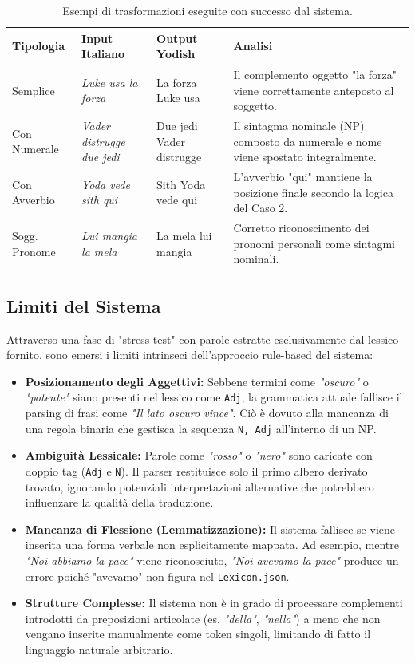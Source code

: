 \documentclass[12pt, a4paper]{article}
\begin{document}
\begin{table}[h!]
\centering
\small
\begin{tabular}{|l|l|l|p{5cm}|}
\hline
\textbf{Tipologia} & \textbf{Input Italiano} & \textbf{Output Yodish} & \textbf{Analisi} \\ \hline
Semplice & \textit{Luke usa la forza} & La forza Luke usa & Il complemento oggetto "la forza" viene correttamente anteposto al soggetto. \\ \hline
Con Numerale & \textit{Vader distrugge due jedi} & Due jedi Vader distrugge & Il sintagma nominale (NP) composto da numerale e nome viene spostato integralmente. \\ \hline
Con Avverbio & \textit{Yoda vede sith qui} & Sith Yoda vede qui & L'avverbio "qui" mantiene la posizione finale secondo la logica del Caso 2. \\ \hline
Sogg. Pronome & \textit{Lui mangia la mela} & La mela lui mangia & Corretto riconoscimento dei pronomi personali come sintagmi nominali. \\ \hline
\end{tabular}
\caption{Esempi di trasformazioni eseguite con successo dal sistema.}
\label{tab:test_successo}
\end{table}

\subsection{Limiti del Sistema}
Attraverso una fase di "stress test" con parole estratte esclusivamente dal lessico fornito, sono emersi i limiti intrinseci dell'approccio rule-based del sistema:

\begin{itemize}
    \item \textbf{Posizionamento degli Aggettivi:} Sebbene termini come \textit{"oscuro"} o \textit{"potente"} siano presenti nel lessico come \texttt{Adj}, la grammatica attuale fallisce il parsing di frasi come \textit{"Il lato oscuro vince"}. Ciò è dovuto alla mancanza di una regola binaria che gestisca la sequenza \texttt{N, Adj} all'interno di un NP.
    \item \textbf{Ambiguità Lessicale:} Parole come \textit{"rosso"} o \textit{"nero"} sono caricate con doppio tag (\texttt{Adj} e \texttt{N}). Il parser restituisce solo il primo albero derivato trovato, ignorando potenziali interpretazioni alternative che potrebbero influenzare la qualità della traduzione.
    \item \textbf{Mancanza di Flessione (Lemmatizzazione):} Il sistema fallisce se viene inserita una forma verbale non esplicitamente mappata. Ad esempio, mentre \textit{"Noi abbiamo la pace"} viene riconosciuto, \textit{"Noi avevamo la pace"} produce un errore poiché "avevamo" non figura nel \texttt{Lexicon.json}.
    \item \textbf{Strutture Complesse:} Il sistema non è in grado di processare complementi introdotti da preposizioni articolate (es. \textit{"della"}, \textit{"nella"}) a meno che non vengano inserite manualmente come token singoli, limitando di fatto il linguaggio naturale arbitrario.
\end{itemize}
\end{document}
